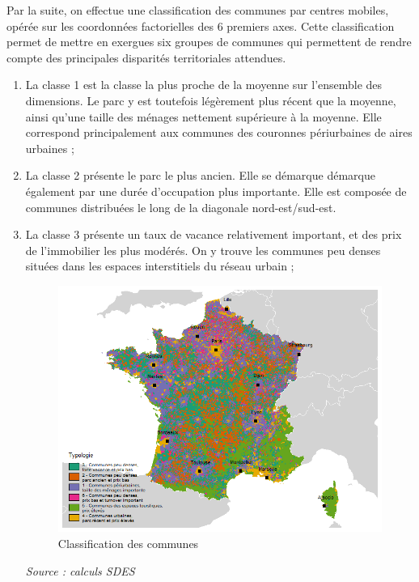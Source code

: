 \documentclass[12pt, a4paper]{article}
\begin{document}
Par la suite, on effectue une classification des communes par centres mobiles, opérée sur les coordonnées factorielles des 6 premiers axes. Cette classification permet de mettre en exergues six groupes de communes qui permettent de rendre compte des principales disparités territoriales attendues. 
\begin{enumerate}
\item La classe 1 est la classe la plus proche de la moyenne sur l'ensemble des dimensions. Le parc y est toutefois légèrement plus récent que la moyenne, ainsi qu'une taille des ménages nettement supérieure à la moyenne. Elle correspond principalement aux communes des couronnes périurbaines de aires urbaines ;
\item La classe 2 présente le parc le plus ancien. Elle se démarque démarque également par une durée d'occupation plus importante. Elle est composée de communes distribuées le long de la diagonale nord-est/sud-est.
\item La classe 3 présente un taux de vacance relativement important, et des prix de l'immobilier les plus modérés. On y trouve les communes peu denses situées dans les espaces interstitiels du réseau urbain ;

\begin{figure}[H]
\caption{Classification des communes}
\begin{center}
\includegraphics[scale=.7]{img/Typo_com.png}
\end{center}
\end{figure}
\emph{Source : calculs SDES}


\end{enumerate}
\end{document}
